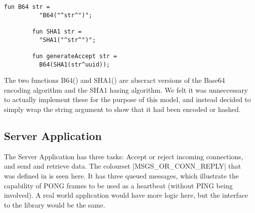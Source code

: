 		
		\begin{lstlisting}[label=lst:generateAccept,caption=generateAccept,gobble=2]
		fun B64 str =
		  "B64("^str^")";
		
		fun SHA1 str =
		  "SHA1("^str^")";

		fun generateAccept str =
		  B64(SHA1(str^uuid));
		\end{lstlisting}
		
		The two functions B64() \cite{rfc4648} and SHA1() \cite{fips.180-2} are
		abscract versions of the Base64 encoding algorithm and the SHA1 hasing algorithm. We felt it was unneccessary
		to actually implement these for the purpose of this model, and instead decided
		to simply wrap the string argument to show that it had been encoded or hashed.
		
\subsection{Server Application}
	
	
	The Server Application has three tasks: Accept or reject incoming connections,
	and send and retrieve data. The colourset |MSGS_OR_CONN_REPLY| that
	was defined in  is seen here. It has three
	queued messages, which illustrate the capability of PONG frames to be used as
	a heartbeat (without PING being involved). A real world application would have
	more logic here, but the interface to the library would be the same.

